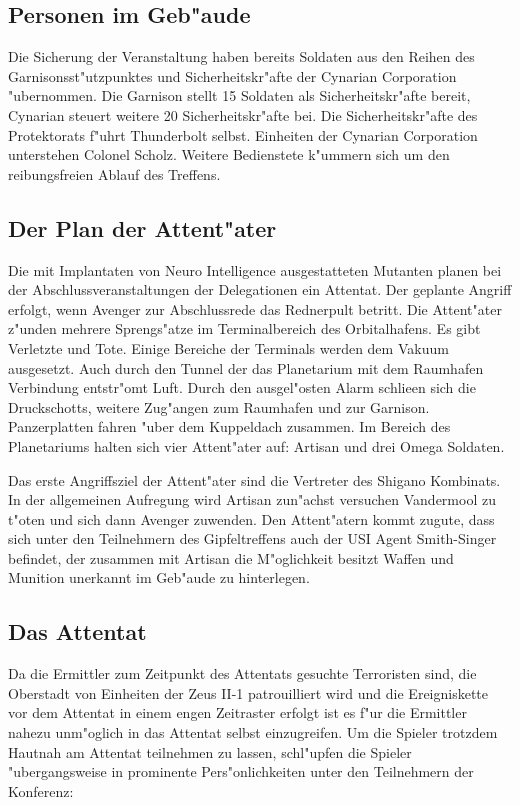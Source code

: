 \subsection{Personen im Geb"aude} 
Die Sicherung der Veranstaltung haben bereits Soldaten aus den Reihen des Garnisonsst"utzpunktes und Sicherheitskr"afte der Cynarian Corporation "ubernommen. Die Garnison stellt 15 Soldaten als Sicherheitskr"afte bereit, Cynarian steuert weitere 20 Sicherheitskr"afte bei. Die Sicherheitskr"afte des Protektorats f"uhrt Thunderbolt selbst. Einheiten der Cynarian Corporation unterstehen Colonel Scholz. Weitere Bedienstete k"ummern sich um den reibungsfreien Ablauf des Treffens.

\subsection{Der Plan der Attent"ater} 
Die mit Implantaten von Neuro Intelligence ausgestatteten Mutanten planen bei der Abschlussveranstaltungen der Delegationen ein Attentat. 
Der geplante Angriff erfolgt, wenn Avenger zur Abschlussrede das Rednerpult betritt. Die Attent"ater z"unden mehrere Sprengs"atze im Terminalbereich des Orbitalhafens. Es gibt Verletzte und Tote. Einige Bereiche der Terminals werden dem Vakuum ausgesetzt. Auch durch den  Tunnel der das Planetarium mit dem Raumhafen Verbindung entstr"omt Luft. Durch den ausgel"osten Alarm schlie\3en sich die Druckschotts, weitere Zug"angen zum Raumhafen und zur Garnison. Panzerplatten fahren "uber dem Kuppeldach zusammen. Im Bereich des Planetariums halten sich vier Attent"ater auf: Artisan und drei Omega Soldaten.

Das erste Angriffsziel der Attent"ater sind die Vertreter des Shigano Kombinats. In der allgemeinen Aufregung wird Artisan zun"achst versuchen Vandermool zu t"oten und sich dann Avenger zuwenden. Den Attent"atern kommt zugute, dass sich unter den Teilnehmern des Gipfeltreffens auch der USI Agent Smith-Singer befindet, der zusammen mit Artisan die M"oglichkeit besitzt Waffen und Munition unerkannt im Geb"aude zu hinterlegen.

\subsection{Das Attentat} 
Da die Ermittler zum Zeitpunkt des Attentats gesuchte Terroristen sind, die Oberstadt von Einheiten der Zeus II-1 patrouilliert wird und die Ereigniskette vor dem Attentat in einem engen Zeitraster erfolgt ist es f"ur die Ermittler nahezu unm"oglich in das Attentat selbst einzugreifen. Um die Spieler trotzdem Hautnah am Attentat teilnehmen zu lassen, schl"upfen die Spieler "ubergangsweise in prominente Pers"onlichkeiten unter den Teilnehmern der Konferenz:

